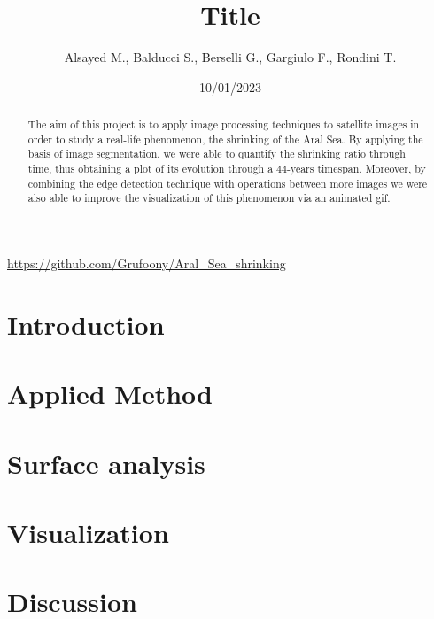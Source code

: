 \documentclass[12pt,a4paper]{article}
\title{Title}
\author{Alsayed M., Balducci S., Berselli G., Gargiulo F., Rondini T.}
\date{10/01/2023}
\begin{document}
\maketitle
\begin{center}
	\url{https://github.com/Grufoony/Aral_Sea_shrinking}
\end{center}

\begin{abstract}
    The aim of this project is to apply image processing techniques to satellite images in order to study a real-life phenomenon, the shrinking of the Aral Sea.
    By applying the basis of image segmentation, we were able to quantify the shrinking ratio through time, thus obtaining a plot of its evolution through a 44-years timespan.
    Moreover, by combining the edge detection technique with operations between more images we were also able to improve the visualization of this phenomenon via an animated gif.
\end{abstract}
\thispagestyle{empty}

\newpage
\thispagestyle{empty}
\addtocounter{page}{-2}
\mbox{}

\tableofcontents
\pagebreak

\section*{Introduction}

\pagebreak

\section{Applied Method}

\pagebreak

\section{Surface analysis}

\pagebreak

\section{Visualization}

\pagebreak

\section{Discussion}


\newpage
\thispagestyle{empty}
\mbox{}

\appendix
\end{document}
